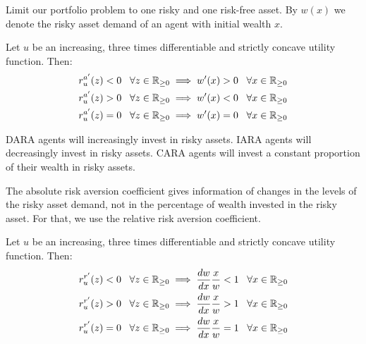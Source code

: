 \documentclass[twoside, titlepage]{article}
\begin{document}
Limit our portfolio problem to one risky and one risk-free asset. By $w(x)$ we denote the risky asset demand of an agent with initial wealth $x$.

\begin{proposition}
    Let $u$ be an increasing, three times differentiable and strictly concave utility function. Then:
    \begin{align*}
        r^{a'}_u(z) < 0 \;\;\; \forall z \in \mathbb{R}_{\geq 0} & \implies w'(x) > 0 \;\;\; \forall x \in \mathbb{R}_{\geq 0} \\
        r^{a'}_u(z) > 0 \;\;\; \forall z \in \mathbb{R}_{\geq 0} & \implies w'(x) < 0 \;\;\; \forall x \in \mathbb{R}_{\geq 0} \\
        r^{a'}_u(z) = 0 \;\;\; \forall z \in \mathbb{R}_{\geq 0} & \implies w'(x) = 0 \;\;\; \forall x \in \mathbb{R}_{\geq 0}
    \end{align*}
    \begin{explanation}
        DARA agents will increasingly invest in risky assets. IARA agents will decreasingly invest in risky assets. CARA agents will invest a constant proportion of their wealth in risky assets.
    \end{explanation}
\end{proposition}

The absolute risk aversion coefficient gives information of changes in the levels of the risky asset demand, not in the percentage of wealth invested in the risky asset. For that, we use the relative risk aversion coefficient.

\begin{proposition}
    Let $u$ be an increasing, three times differentiable and strictly concave utility function. Then:
    \begin{align*}
        r^{r'}_u(z) < 0 \;\;\; \forall z \in \mathbb{R}_{\geq 0} & \implies \frac{dw}{dx}\frac{x}{w} < 1 \;\;\; \forall x \in \mathbb{R}_{\geq 0} \\
        r^{r'}_u(z) > 0 \;\;\; \forall z \in \mathbb{R}_{\geq 0} & \implies \frac{dw}{dx}\frac{x}{w} > 1 \;\;\; \forall x \in \mathbb{R}_{\geq 0} \\
        r^{r'}_u(z) = 0 \;\;\; \forall z \in \mathbb{R}_{\geq 0} & \implies \frac{dw}{dx}\frac{x}{w} = 1 \;\;\; \forall x \in \mathbb{R}_{\geq 0}
    \end{align*}
    \begin{explanation}
    \end{explanation}
\end{proposition}
\end{document}
